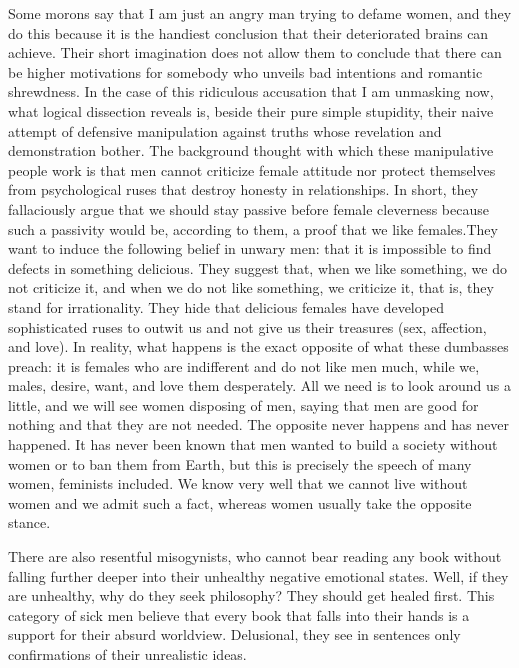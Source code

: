 \par Some morons say that I am just an angry man trying to defame women, and they do this because it is the handiest conclusion that their deteriorated brains can achieve. Their short imagination does not allow them to conclude that there can be higher motivations for somebody who unveils bad intentions and romantic shrewdness. In the case of this ridiculous accusation that I am unmasking now, what logical dissection reveals is, beside their pure simple stupidity, their naive attempt of defensive manipulation against truths whose revelation and demonstration bother. The background thought with which these manipulative people work is that men cannot criticize female attitude nor protect themselves from psychological ruses that destroy honesty in relationships. In short, they fallaciously argue that we should stay passive before female cleverness because such a passivity would be, according to them, a proof that we like females.\footnotemark[10] They want to induce the following belief in unwary men: that it is impossible to find defects in something delicious. They suggest that, when we like something, we do not criticize it, and when we do not like something, we criticize it, that is, they stand for irrationality. They hide that delicious females have developed sophisticated ruses to outwit us and not give us their treasures (sex, affection, and love). In reality, what happens is the exact opposite of what these dumbasses preach: it is females who are indifferent and do not like men much, while we, males, desire, want, and love them desperately. All we need is to look around us a little, and we will see women disposing of men, saying that men are good for nothing and that they are not needed. The opposite never happens and has never happened. It has never been known that men wanted to build a society without women or to ban them from Earth, but this is precisely the speech of many women, feminists included. We know very well that we cannot live without women and we admit such a fact\footnotemark[11], whereas women usually take the opposite stance.


\footnotetext[11]{}

\par There are also resentful misogynists, who cannot bear reading any book without falling further deeper into their unhealthy negative emotional states. Well, if they are unhealthy, why do they seek philosophy? They should get healed first. This category of sick men believe that every book that falls into their hands is a support for their absurd worldview. Delusional, they see in sentences only confirmations of their unrealistic ideas.

